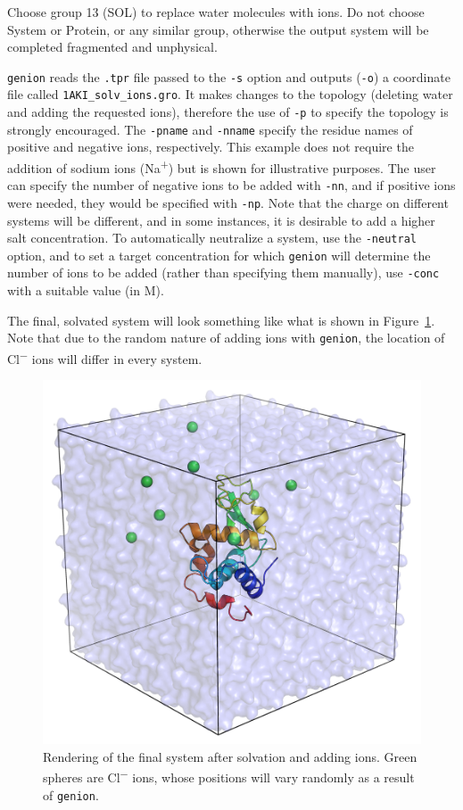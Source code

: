 \documentclass[9pt,tutorial,pubversion]{livecoms}
\begin{document}
Choose group 13 (SOL) to replace water molecules with ions. Do not choose System or Protein, or any similar group, otherwise the output system will be completed fragmented and unphysical.

\texttt{genion} reads the \texttt{.tpr} file passed to the \texttt{-s} option and outputs (\texttt{-o}) a coordinate file called \texttt{1AKI\_solv\_ions.gro}. It makes changes to the topology (deleting water and adding the requested ions), therefore the use of \texttt{-p} to specify the topology is strongly encouraged. The \texttt{-pname} and \texttt{-nname} specify the residue names of positive and negative ions, respectively. This example does not require the addition of sodium ions (Na\textsuperscript{+}) but is shown for illustrative purposes. The user can specify the number of negative ions to be added with \texttt{-nn}, and if positive ions were needed, they would be specified with \texttt{-np}. Note that the charge on different systems will be different, and in some instances, it is desirable to add a higher salt concentration. To automatically neutralize a system, use the \texttt{-neutral} option, and to set a target concentration for which \texttt{genion} will determine the number of ions to be added (rather than specifying them manually), use \texttt{-conc} with a suitable value (in M).

The final, solvated system will look something like what is shown in Figure~\ref{lyso_solv_ions_fig}. Note that due to the random nature of adding ions with \texttt{genion}, the location of Cl\textsuperscript{$-$} ions will differ in every system.

\begin{figure}[h]
\centering
\includegraphics{1AKI_solv_ions}
\caption{Rendering of the final system after solvation and adding ions. Green spheres are Cl\textsuperscript{$-$} ions, whose positions will vary randomly as a result of \texttt{genion}.}
\label{lyso_solv_ions_fig}
\end{figure}
\end{document}
